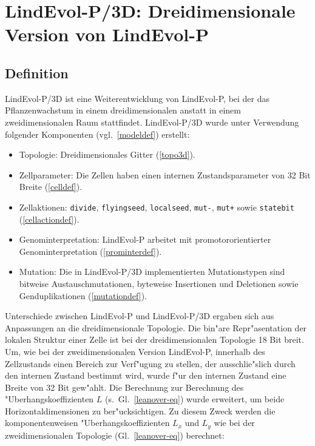 \chapter[LindEvol-P/3D]{LindEvol-P/3D: Dreidimensionale Version von LindEvol-P}
\label{lnd5-3d}


\section{Definition}

LindEvol-P/3D ist eine Weiterentwicklung von LindEvol-P, bei der das Pflanzenwachstum
in einem dreidimensionalen anstatt in einem zweidimensionalen Raum stattfindet.
LindEvol-P/3D wurde unter Verwendung folgender Komponenten (vgl.\ \ref{modeldef}) erstellt:

\begin{itemize}
\item Topologie: Dreidimensionales Gitter (\protect\ref{topo3d}).
\item Zellparameter: Die Zellen haben einen internen Zustandsparameter von
    32 Bit Breite (\protect\ref{celldef}).
\item \begin{sloppypar} Zellaktionen: \verb|divide|, \verb|flyingseed|, \verb|localseed|,
    \verb|mut-|, \verb|mut+| sowie \verb|statebit| (\protect\ref{cellactiondef}).
    \end{sloppypar}
\item Genominterpretation: LindEvol-P arbeitet mit promotororientierter
    Genominterpretation (\protect\ref{prominterdef}).
\item Mutation: Die in LindEvol-P/3D implementierten Mutationstypen sind
    bitweise Austauschmutationen, byteweise Insertionen und Deletionen
    sowie Genduplikationen (\protect\ref{mutationdef}).
\end{itemize}

Unterschiede zwischen LindEvol-P und LindEvol-P/3D ergaben sich aus Anpassungen an die
dreidimensionale Topologie. Die bin"are Repr"asentation der lokalen Struktur
einer Zelle ist bei der dreidimensionalen Topologie 18 Bit breit. Um, wie bei der zweidimensionalen
Version LindEvol-P, innerhalb des Zellzustands einen Bereich zur Verf"ugung zu stellen, der
ausschlie"slich durch den internen Zustand bestimmt wird, wurde f"ur den internen Zustand
eine Breite von 32 Bit gew"ahlt. Die Berechnung zur Berechnung des
"Uberhangskoeffizienten  $L$ (s.\ Gl.\ \ref{leanover-eq}) wurde erweitert,
um beide Horizontaldimensionen zu ber"ucksichtigen. Zu diesem Zweck werden
die komponentenweisen "Uberhangskoeffizienten $L_x$ und $L_y$ wie bei
der zweidimensionalen Topologie (Gl.\ \ref{leanover-eq}) berechnet:

